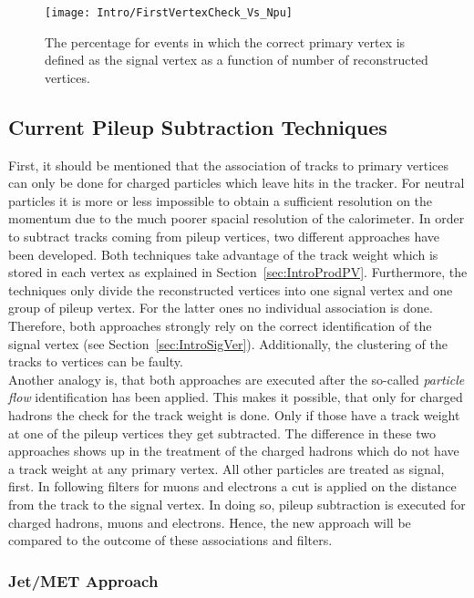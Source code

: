 \begin{figure}[!Hhtb]
  \centering
  \texttt{[image: Intro/FirstVertexCheck\_Vs\_Npu]}
  \caption[Probability to define the correct vertex as signal]{The percentage for events in which the correct primary vertex is defined as the signal vertex as a function of number of reconstructed vertices. \label{plot:IntroSigVertexProb}}
\end{figure}


\subsection{Current Pileup Subtraction Techniques\label{sec:IntroCurPST}}

First, it should be mentioned that the association of tracks to primary vertices can only be done for charged particles which leave hits in the tracker. For neutral particles it is more or less impossible to obtain a sufficient resolution on the momentum due to the much poorer spacial resolution of the calorimeter. In order to subtract tracks coming from pileup vertices, two different approaches have been developed. Both techniques take advantage of the track weight which is stored in each vertex as explained in Section~\ref{sec:IntroProdPV}. Furthermore, the techniques only divide the reconstructed vertices into one signal vertex and one group of pileup vertex. For the latter ones no individual association is done. Therefore, both approaches strongly rely on the correct identification of the signal vertex (see Section~\ref{sec:IntroSigVer}). Additionally, the clustering of the tracks to vertices can be faulty. \\
Another analogy is, that both approaches are executed after the so-called \textit{particle flow} identification has been applied. This makes it possible, that only for charged hadrons  the check for the track weight is done.  Only if those have a track weight at one of the pileup vertices they get subtracted. The difference in these two approaches shows up in the treatment of the charged hadrons which do not have a track weight at any primary vertex. All other particles are treated as signal, first. In following filters for muons and electrons a cut is applied on the distance from the track to the signal vertex. In doing so, pileup subtraction is executed for charged hadrons, muons and electrons. Hence, the new approach will be compared to the outcome of these associations and filters.

\subsubsection{Jet/MET Approach \label{sec:IntroJM}}

